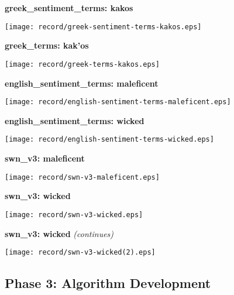 \textbf{greek\_sentiment\_terms: \textgreek{kakos}} \\

\begin{center}
\texttt{[image: record/greek-sentiment-terms-kakos.eps]}
\end{center}

\clearpage

\textbf{greek\_terms: \textgreek{kak'os}} \\

\begin{center}
\texttt{[image: record/greek-terms-kakos.eps]}
\end{center}

\clearpage

\textbf{english\_sentiment\_terms: maleficent} \\

\begin{center}
\texttt{[image: record/english-sentiment-terms-maleficent.eps]}
\end{center}

\clearpage

\textbf{english\_sentiment\_terms: wicked} \\

\begin{center}
\texttt{[image: record/english-sentiment-terms-wicked.eps]}
\end{center}

\clearpage

\textbf{swn\_v3: maleficent} \\

\begin{center}
\texttt{[image: record/swn-v3-maleficent.eps]}
\end{center}

\clearpage

\textbf{swn\_v3: wicked} \\

\begin{center}
\texttt{[image: record/swn-v3-wicked.eps]}
\end{center}

\clearpage

\textbf{swn\_v3: wicked} \textit{(continues)} \\

\begin{center}
\texttt{[image: record/swn-v3-wicked(2).eps]}
\end{center}

\clearpage

\subsection{Phase 3: Algorithm Development}
\label{subsec:algorithm}
